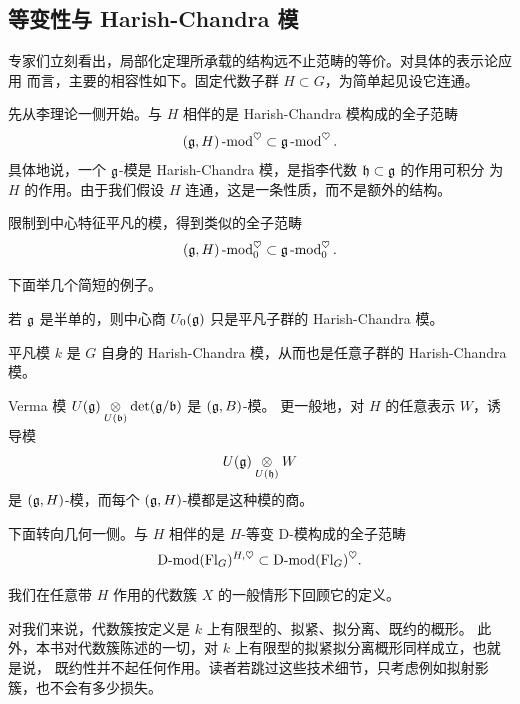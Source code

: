 
\subsection{等变性与 Harish-Chandra 模}

\ssszh 专家们立刻看出，局部化定理所承载的结构远不止范畴的等价。对具体的表示论应用
而言，主要的相容性如下。固定代数子群 $H \subset G$，为简单起见设它连通。

\ssszh 先从李理论一侧开始。与 $H$ 相伴的是 Harish-Chandra 模构成的全子范畴
%
\[
(\mathfrak{g}, H)\operatorname{-mod}^\heartsuit \subset \mathfrak{g}\operatorname{-mod}^\heartsuit.
\]
%
具体地说，一个 $\mathfrak{g}$-模是 Harish-Chandra 模，是指李代数 $\mathfrak{h} \subset \mathfrak{g}$ 的作用可积分
为 $H$ 的作用。由于我们假设 $H$ 连通，这是一条性质，而不是额外的结构。

限制到中心特征平凡的模，得到类似的全子范畴
%
\[
(\mathfrak{g}, H)\operatorname{-mod}_0^\heartsuit \subset \mathfrak{g}\operatorname{-mod}_0^\heartsuit.
\]
%

\ssszh 下面举几个简短的例子。

\begin{ex}
若 $\mathfrak{g}$ 是半单的，则中心商 $U_0(\mathfrak{g})$ 只是平凡子群的 Harish-Chandra 模。
\end{ex}

\begin{ex} 平凡模 $k$ 是 $G$ 自身的 Harish-Chandra 模，从而也是任意子群的
Harish-Chandra 模。
\end{ex}

\begin{ex} Verma 模 $U(\mathfrak{g}) \underset{U(\mathfrak{b})} \otimes \det(\mathfrak{g}/\mathfrak{b})$ 是 $(\mathfrak{g}, B)$-模。
更一般地，对 $H$ 的任意表示 $W$，诱导模
%
\[
U(\mathfrak{g}) \underset{U(\mathfrak{h})} \otimes W
\]
%
是 $(\mathfrak{g}, H)$-模，而每个 $(\mathfrak{g}, H)$-模都是这种模的商。
\end{ex}

\ssszh \label{s:eqdmod}下面转向几何一侧。与 $H$ 相伴的是 $H$-等变 D-模构成的全子范畴
%
\[
\operatorname{D-mod}(\operatorname{Fl}_G)^{H, \heartsuit} \subset \operatorname{D-mod}(\operatorname{Fl}_G)^\heartsuit.
\]
%

我们在任意带 $H$ 作用的代数簇 $X$ 的一般情形下回顾它的定义。

\begin{re} 对我们来说，代数簇按定义是 $k$ 上有限型的、拟紧、拟分离、既约的概形。
此外，本书对代数簇陈述的一切，对 $k$ 上有限型的拟紧拟分离概形同样成立，也就是说，
既约性并不起任何作用。读者若跳过这些技术细节，只考虑例如拟射影簇，也不会有多少损失。
\end{re}

